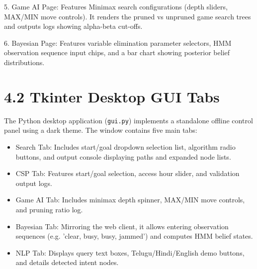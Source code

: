 \documentclass[12pt,a4paper]{report}
\begin{document}
\begin{center}
\end{center}

5. Game AI Page: Features Minimax search configurations (depth sliders, MAX/MIN move controls). It renders the pruned vs unpruned game search trees and outputs logs showing alpha-beta cut-offs.

\begin{center}
\end{center}

6. Bayesian Page: Features variable elimination parameter selectors, HMM observation sequence input chips, and a bar chart showing posterior belief distributions.

\begin{center}
\end{center}


\section{4.2 Tkinter Desktop GUI Tabs}

The Python desktop application (\texttt{gui.py}) implements a standalone offline control panel using a dark theme. The window contains five main tabs:

\begin{center}
\end{center}

\begin{itemize}
\item \textbullet{} Search Tab: Includes start/goal dropdown selection list, algorithm radio buttons, and output console displaying paths and expanded node lists.
\item \textbullet{} CSP Tab: Features start/goal selection, access hour slider, and validation output logs.
\item \textbullet{} Game AI Tab: Includes minimax depth spinner, MAX/MIN move controls, and pruning ratio log.
\item \textbullet{} Bayesian Tab: Mirroring the web client, it allows entering observation sequences (e.g. 'clear, busy, busy, jammed') and computes HMM belief states.
\item \textbullet{} NLP Tab: Displays query text boxes, Telugu/Hindi/English demo buttons, and details detected intent nodes.
\end{itemize}
\end{document}
